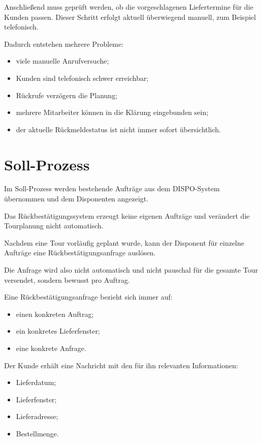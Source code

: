 \documentclass[12pt,a4paper]{article}
\begin{document}
	Anschließend muss geprüft werden, ob die vorgeschlagenen Liefertermine für die Kunden passen. Dieser Schritt erfolgt aktuell überwiegend manuell, zum Beispiel telefonisch.
	
	Dadurch entstehen mehrere Probleme:
	
	\begin{itemize}
		\item viele manuelle Anrufversuche;
		\item Kunden sind telefonisch schwer erreichbar;
		\item Rückrufe verzögern die Planung;
		\item mehrere Mitarbeiter können in die Klärung eingebunden sein;
		\item der aktuelle Rückmeldestatus ist nicht immer sofort übersichtlich.
	\end{itemize}
	
	\section{Soll-Prozess}
	
	Im Soll-Prozess werden bestehende Aufträge aus dem DISPO-System übernommen und dem Disponenten angezeigt.
	
	Das Rückbestätigungssystem erzeugt keine eigenen Aufträge und verändert die Tourplanung nicht automatisch.
	
	Nachdem eine Tour vorläufig geplant wurde, kann der Disponent für einzelne Aufträge eine Rückbestätigungsanfrage auslösen.
	
	Die Anfrage wird also nicht automatisch und nicht pauschal für die gesamte Tour versendet, sondern bewusst pro Auftrag.
	
	Eine Rückbestätigungsanfrage bezieht sich immer auf:
	
	\begin{itemize}
		\item einen konkreten Auftrag;
		\item ein konkretes Lieferfenster;
		\item eine konkrete Anfrage.
	\end{itemize}
	
	Der Kunde erhält eine Nachricht mit den für ihn relevanten Informationen:
	
	\begin{itemize}
		\item Lieferdatum;
		\item Lieferfenster;
		\item Lieferadresse;
		\item Bestellmenge.
	\end{itemize}
	
\end{document}
